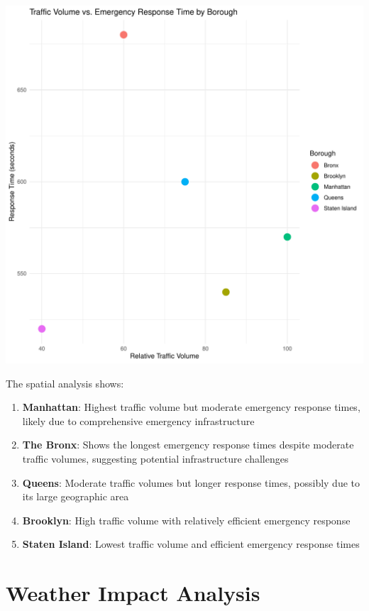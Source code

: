 \documentclass[
  letterpaper,
  DIV=11,
  numbers=noendperiod]{scrreprt}
\begin{document}
\includegraphics[width=1\textwidth,height=\textheight]{figures/spatial-patterns-1.pdf}

The spatial analysis shows:

\begin{enumerate}
\def\labelenumi{\arabic{enumi}.}
\item
  \textbf{Manhattan}: Highest traffic volume but moderate emergency
  response times, likely due to comprehensive emergency infrastructure
\item
  \textbf{The Bronx}: Shows the longest emergency response times despite
  moderate traffic volumes, suggesting potential infrastructure
  challenges
\item
  \textbf{Queens}: Moderate traffic volumes but longer response times,
  possibly due to its large geographic area
\item
  \textbf{Brooklyn}: High traffic volume with relatively efficient
  emergency response
\item
  \textbf{Staten Island}: Lowest traffic volume and efficient emergency
  response times
\end{enumerate}

\section{Weather Impact Analysis}\label{weather-impact-analysis}
\end{document}
